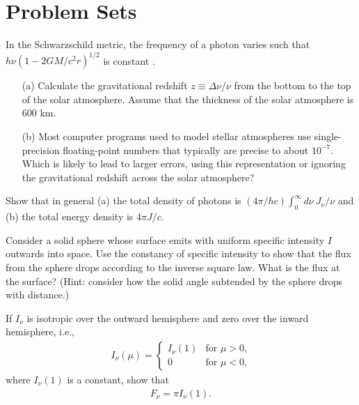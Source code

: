 \chapter{Problem Sets}


\clearpage
\problemset

\begin{problem}
In the Schwarzschild metric, the frequency of a photon varies such that
$h\nu(1-2GM/c^2r)^{1/2}$ is constant \cite*[p.\ 187 and p.\ 659,
  although note that these authors set $G = c = 1$]{Misner-1973}.
\begin{enumerate}
\item[(a)]
Calculate the gravitational redshift $z \equiv \Delta\nu/\nu$ from the bottom to the top of the solar atmosphere. Assume that the thickness of the solar atmosphere is 600 km.
\item[(b)] Most computer programs used to model stellar atmospheres use
  single-precision floating-point numbers that typically are precise to
  about $10^{-7}$. Which is likely to lead to larger errors, using this
  representation or ignoring the gravitational redshift across the solar
  atmosphere?
\label{problem-gravitational-redshift}
\end{enumerate}
\end{problem}

\begin{problem}
\label{problem-photon-density}
\label{problem-energy-density}
Show that in general (a) the total density of photons is $(4\pi/h c)
\int_0^\infty\!d\nu\: J_\nu / \nu$ and (b) the total energy density is
$4\pi J / c$.
\end{problem}

\begin{problem}
Consider a solid sphere whose surface emits with uniform specific
intensity $I$ outwards into space. Use the constancy of specific
intensity to show that the flux from the sphere drops according to the
inverse square law. What is the flux at the surface? (Hint: consider how
the solid angle subtended by the sphere drops with distance.)
\end{problem}

\begin{problem}
\label{problem-flux-from-surface}
If $I_\nu$ is
isotropic over the outward hemisphere and zero over the
inward hemisphere, i.e.,
\begin{align}
I_\nu(\mu) =
\begin{cases}
I_\nu(1)&\mbox{for $\mu>0$,}\\
0&\mbox{for $\mu<0$,}
\end{cases}
\end{align}
where $I_\nu(1)$ is a constant, 
show that
\begin{align}
F_\nu = \pi I_\nu(1).
\end{align}
\end{problem}

